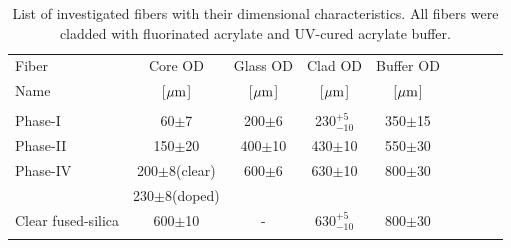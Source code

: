 \documentclass[a4paper,11pt]{article}
\begin{document}
\begin{table}[htp]
\caption{\small List of investigated fibers with their dimensional characteristics. All fibers were cladded with fluorinated acrylate and UV-cured acrylate buffer.}
\vspace{-2 mm}
\begin{center}
{\small
\begin{tabular}{|l|c|c|c|c|c|c|c|c|} \hline
Fiber              &  Core OD            & Glass OD        & Clad OD          & Buffer  OD        \\
Name               &[${\rm \mu m}$]      & [${\rm \mu m}$] & [${\rm \mu m}$]  & [${\rm \mu m}$]   \\
\hline
                    &                     &                &                  & \\
Phase-I            & 60$\pm$7            &	200$\pm$6      & 230$^{+5}_{-10}$ &	350$\pm$15        \\
Phase-II           & 150$\pm$20		     &	400$\pm$10     & 430$\pm$10	      &	550$\pm$30        \\
Phase-IV           & 200$\pm$8(clear)   &	600$\pm$6	   & 630$\pm$10       &	800$\pm$30        \\
                          & 230$\pm$8(doped) &	   &     &	         \\
Clear fused-silica & 600$\pm$10          &-				   & 630$^{+5}_{-10}$ &	800$\pm$30	      \\
                    &                     &                &                  & \\
\hline
\end{tabular}
}
\end{center}
\label{tab:fiberlist}
\end{table}
\end{document}
